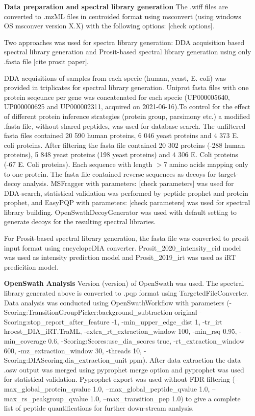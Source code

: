 \documentclass[10pt,letterpaper]{article}
\begin{document}
\textbf{Data preparation and spectral library generation}
The .wiff files are converted to .mzML files in centroided format using msconvert (using windows OS msconver version X.X) with the following options: [check options]. 

Two approaches was used for spectra library generation: DDA acquisition based spectral library generation and Prosit-based spectral library generation using only .fasta file [cite prosit paper]. 

DDA acquisitions of samples from each specie (human, yeast, E. coli) was provided in triplicates for spectral library generation. Uniprot fasta files with one protein seqeunce per gene was concatenated for each specie (UP000005640, UP000000625 and UP000002311, acquired on 2021-06-16).To control for the effect of different protein inference strategies (protein group, parsimony etc.) a modified .fasta file, without shared peptides, was used for database search. The unfiltered fasta files contained 20 590 human proteins, 6 046 yeast proteins and 4 373 E. coli proteins. After filtering the fasta file contained 20 302 proteins (-288 human proteins), 5 848 yeast proteins (198 yeast proteins) and 4 306 E. Coli proteins (-67 E. Coli proteins). Each sequence with length $>$7 amino acids mapping only to one protein. The fasta file contained reverse sequences as decoys for target-decoy analysis. MSFragger with parameters: [check parameters] was used for DDA-search, statistical validation was performed by peptide prophet and protein prophet, and EasyPQP with parameters: [check parameters] was used for spectral library building. OpenSwathDecoyGenerator was used with default setting to generate decoys for the resulting spectral libraries.  

For Prosit-based spectral library generation, the fasta file was converted to prosit input format using encyclopeDIA converter. Prosit\_2020\_intensity\_cid model was used as intensity prediction model and Prosit\_2019\_irt was used as iRT predicition model.  


\textbf{OpenSwath Analysis}
Version (version) of OpenSwath was used. The spectral library generated above is converted to .pqp format using TargetedFileConverter. Data analysis was conducted using OpenSwathWorkflow with parameters (-Scoring:TransitionGroupPicker:background\_subtraction original -Scoring:stop\_report\_after\_feature -1, -min\_upper\_edge\_dist 1, -tr\_irt hroest\_DIA\_iRT.TraML, -extra\_rt\_extraction\_window 100, -min\_rsq 0.95, -min\_coverage 0.6, -Scoring:Scores:use\_dia\_scores true, -rt\_extraction\_window 600, -mz\_extraction\_window 30, -threads 10, -Scoring:DIAScoring:dia\_extraction\_unit ppm). After data extraction the data .osw output was merged using pyprophet merge option and pyprophet was used for statistical validation. Pyprophet export was used without FDR filtering (--max\_global\_protein\_qvalue 1.0, --max\_global\_peptide\_qvalue 1.0, --max\_rs\_peakgroup\_qvalue 1.0, --max\_transition\_pep 1.0) to give a complete list of peptide quantifications for further down-stream analysis.
\end{document}
